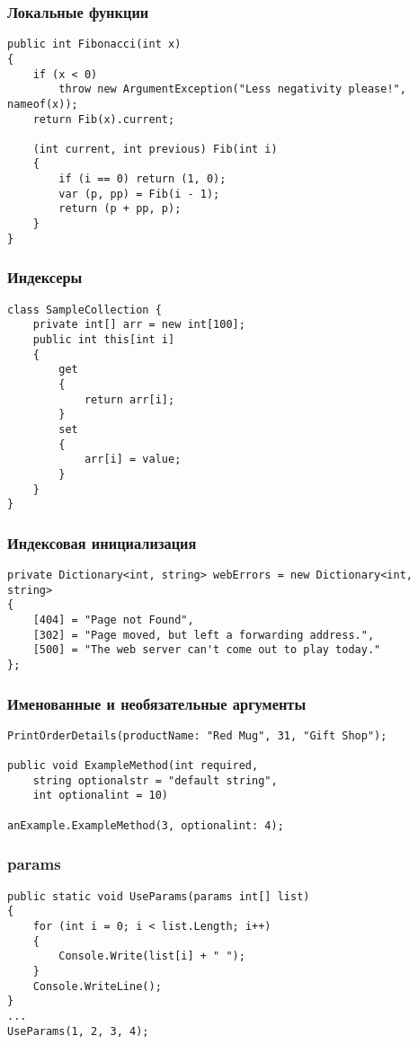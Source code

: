 \documentclass[xetex,mathserif,serif]{beamer}
\begin{document}
	\begin{frame}[fragile]
		\frametitle{Локальные функции}
		\begin{small}
			\begin{verbatim}
public int Fibonacci(int x)
{
    if (x < 0) 
        throw new ArgumentException("Less negativity please!", nameof(x));
    return Fib(x).current;

    (int current, int previous) Fib(int i)
    {
        if (i == 0) return (1, 0);
        var (p, pp) = Fib(i - 1);
        return (p + pp, p);
    }
}
			\end{verbatim}
		\end{small}
	\end{frame}

	\begin{frame}[fragile]
		\frametitle{Индексеры}
		\begin{verbatim}
class SampleCollection {
    private int[] arr = new int[100];
    public int this[int i]
    {
        get
        {
            return arr[i];
        }
        set
        {
            arr[i] = value;
        }
    }
}
		\end{verbatim}
	\end{frame}

	\begin{frame}[fragile]
		\frametitle{Индексовая инициализация}
		\begin{verbatim}
private Dictionary<int, string> webErrors = new Dictionary<int, string>
{
    [404] = "Page not Found",
    [302] = "Page moved, but left a forwarding address.",
    [500] = "The web server can't come out to play today."
};
		\end{verbatim}
	\end{frame}

	\begin{frame}[fragile]
		\frametitle{Именованные и необязательные аргументы}
		\begin{verbatim}
PrintOrderDetails(productName: "Red Mug", 31, "Gift Shop");

public void ExampleMethod(int required, 
    string optionalstr = "default string",
    int optionalint = 10)

anExample.ExampleMethod(3, optionalint: 4);
		\end{verbatim}
	\end{frame}

	\begin{frame}[fragile]
		\frametitle{params}
		\begin{verbatim}
public static void UseParams(params int[] list)
{
    for (int i = 0; i < list.Length; i++)
    {
        Console.Write(list[i] + " ");
    }
    Console.WriteLine();
}
...
UseParams(1, 2, 3, 4);
		\end{verbatim}
	\end{frame}
\end{document}
